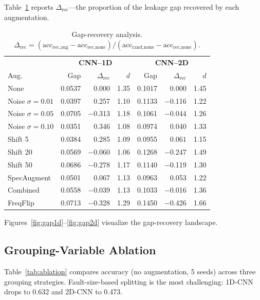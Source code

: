 ﻿\documentclass[11pt,a4paper]{article}
\begin{document}
Table~\ref{tab:gap} reports $\Delta_{\text{rec}}$---the proportion of the leakage gap recovered by each augmentation.

\begin{table}[H]
\centering
\caption{Gap-recovery analysis. $\Delta_{\text{rec}} = (\text{acc}_{\text{rec},\text{aug}} - \text{acc}_{\text{rec},\text{none}}) / (\text{acc}_{\text{rand},\text{none}} - \text{acc}_{\text{rec},\text{none}})$.}
\label{tab:gap}
\begin{tabular}{lrrrrrr}
\toprule
& \multicolumn{3}{c}{\textbf{CNN--1D}} & \multicolumn{3}{c}{\textbf{CNN--2D}} \\
Aug. & Gap & $\Delta_{\text{rec}}$ & $d$ & Gap & $\Delta_{\text{rec}}$ & $d$ \\ \midrule
None          & 0.0537 & 0.000 & 1.35 & 0.1017 & 0.000 & 1.45 \\
Noise $\sigma=0.01$ & 0.0397 & 0.257 & 1.10 & 0.1133 & $-$0.116 & 1.22 \\
Noise $\sigma=0.05$ & 0.0705 & $-$0.313 & 1.18 & 0.1061 & $-$0.044 & 1.26 \\
Noise $\sigma=0.10$ & 0.0351 & $\mathbf{0.346}$ & 1.08 & 0.0974 & 0.040 & 1.33 \\
Shift 5       & 0.0384 & 0.285 & 1.09 & 0.0955 & $\mathbf{0.061}$ & 1.15 \\
Shift 20      & 0.0569 & $-$0.060 & 1.06 & 0.1268 & $-$0.247 & 1.49 \\
Shift 50      & 0.0686 & $-$0.278 & 1.17 & 0.1140 & $-$0.119 & 1.30 \\
SpecAugment   & 0.0501 & 0.067 & 1.13 & 0.0963 & 0.053 & 1.22 \\
Combined      & 0.0558 & $-$0.039 & 1.13 & 0.1033 & $-$0.016 & 1.36 \\
FreqFlip      & 0.0713 & $-$0.328 & 1.29 & 0.1450 & $-$0.426 & 1.66 \\
\bottomrule
\end{tabular}
\end{table}

Figures~\ref{fig:gap1d}--\ref{fig:gap2d} visualize the gap-recovery landscape.

\subsection{Grouping-Variable Ablation}

Table~\ref{tab:ablation} compares accuracy (no augmentation, 5 seeds) across three grouping strategies. Fault-size-based splitting is the most challenging: 1D-CNN drops to 0.632 and 2D-CNN to 0.473.
\end{document}

